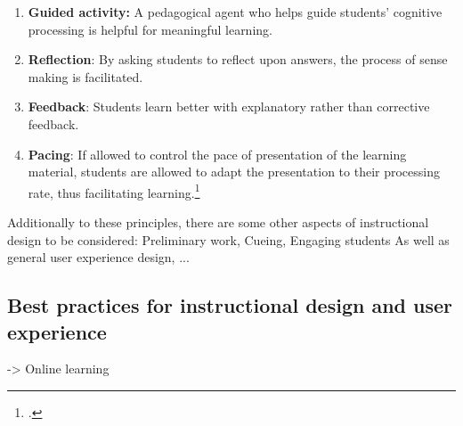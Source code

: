 \begin{enumerate}
    \begin{enumerate}
        \item \textbf{Guided activity:} A pedagogical agent who helps guide students' cognitive processing is helpful for meaningful learning.
        \item \textbf{Reflection}: By asking students to reflect upon answers, the process of sense making is facilitated.
        \item \textbf{Feedback}: Students learn better with explanatory rather than corrective feedback.
        \item \textbf{Pacing}: If allowed to control the pace of presentation of the learning material, students are allowed to adapt the presentation to their processing rate, thus facilitating learning.\footcites[Cf.][p.316]{MorenoInteractiveMultimodalLearning2007}
    \end{enumerate}
    
\end{enumerate}

Additionally to these principles, there are some other aspects of instructional design to be considered: Preliminary work, Cueing, Engaging students 
As well as general user experience design, ...

\subsection{Best practices for instructional design and user experience} -> Online learning 


